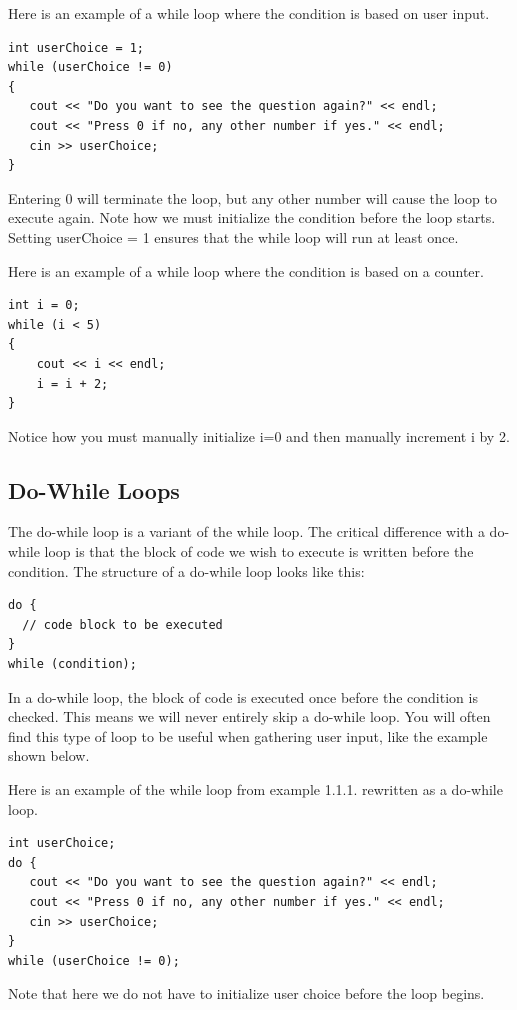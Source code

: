 \begin{example}
Here is an example of a while loop where the condition is based on user input. 
\begin{verbatim}
int userChoice = 1;
while (userChoice != 0)
{
   cout << "Do you want to see the question again?" << endl; 
   cout << "Press 0 if no, any other number if yes." << endl;
   cin >> userChoice;
}
\end{verbatim}
Entering 0 will terminate the loop, but any other number will cause the loop to execute again. Note how we must initialize the condition before the loop starts. Setting userChoice = 1 ensures that the while loop will run at least once.
\end{example}

\begin{example}
    Here is an example of a while loop where the condition is based on a counter.
    \begin{verbatim}
int i = 0; 
while (i < 5)
{
	cout << i << endl;
	i = i + 2;
}
    \end{verbatim}
    Notice how you must manually initialize i=0 and then manually increment i by 2.
\end{example}

\subsection{Do-While Loops}
The do-while loop is a variant of the while loop. The critical difference with a do-while loop is that the block of code we wish to execute is written before the condition. The structure of a do-while loop looks like this:
\begin{verbatim}
do {
  // code block to be executed
}
while (condition);
\end{verbatim}

In a do-while loop, the block of code is executed once before the condition is checked. This means we will never entirely skip a do-while loop. You will often find this type of loop to be useful when gathering user input, like the example shown below.

\begin{example}
    Here is an example of the while loop from example 1.1.1. rewritten as a do-while loop.

    \begin{verbatim}
int userChoice;
do {
   cout << "Do you want to see the question again?" << endl; 
   cout << "Press 0 if no, any other number if yes." << endl;
   cin >> userChoice;
}  
while (userChoice != 0);
    \end{verbatim}

    Note that here we do not have to initialize user choice before the loop begins.
    
\end{example}


